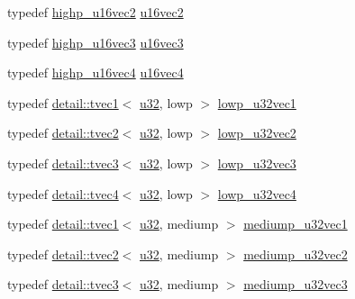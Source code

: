 \begin{DoxyCompactItemize}
\item 
typedef \hyperlink{group__gtc__type__precision_gafad4245d389a4990eb505cd74a2d0a6f}{highp\+\_\+u16vec2} \hyperlink{group__gtc__type__precision_ga4beac509930099bb494b4bd0a44c49f2}{u16vec2}
\item 
typedef \hyperlink{group__gtc__type__precision_gad98b30ad9bbfb79233340be3ba53ceb6}{highp\+\_\+u16vec3} \hyperlink{group__gtc__type__precision_ga372e1184da616b77fcbd48b8c166c24a}{u16vec3}
\item 
typedef \hyperlink{group__gtc__type__precision_ga89074b108ec0643cffdfd008bedd3ffb}{highp\+\_\+u16vec4} \hyperlink{group__gtc__type__precision_gaac02cce8820bcdbbeea9659aeaa718fb}{u16vec4}
\item 
typedef \hyperlink{structglm_1_1detail_1_1tvec1}{detail\+::tvec1}$<$ \hyperlink{group__gtc__type__precision_ga54e837745059fd29017bed71cfa0a8db}{u32}, lowp $>$ \hyperlink{group__gtc__type__precision_ga579d71c2ae1225b689aaab0bc7d33146}{lowp\+\_\+u32vec1}
\item 
typedef \hyperlink{structglm_1_1detail_1_1tvec2}{detail\+::tvec2}$<$ \hyperlink{group__gtc__type__precision_ga54e837745059fd29017bed71cfa0a8db}{u32}, lowp $>$ \hyperlink{group__gtc__type__precision_ga2f588e15c609987b89bd03f50b2a492d}{lowp\+\_\+u32vec2}
\item 
typedef \hyperlink{structglm_1_1detail_1_1tvec3}{detail\+::tvec3}$<$ \hyperlink{group__gtc__type__precision_ga54e837745059fd29017bed71cfa0a8db}{u32}, lowp $>$ \hyperlink{group__gtc__type__precision_ga53b6133cd2491fce1445c1744556b1bb}{lowp\+\_\+u32vec3}
\item 
typedef \hyperlink{structglm_1_1detail_1_1tvec4}{detail\+::tvec4}$<$ \hyperlink{group__gtc__type__precision_ga54e837745059fd29017bed71cfa0a8db}{u32}, lowp $>$ \hyperlink{group__gtc__type__precision_gaad6408408c9c5321cb6ee54f201de578}{lowp\+\_\+u32vec4}
\item 
typedef \hyperlink{structglm_1_1detail_1_1tvec1}{detail\+::tvec1}$<$ \hyperlink{group__gtc__type__precision_ga54e837745059fd29017bed71cfa0a8db}{u32}, mediump $>$ \hyperlink{group__gtc__type__precision_ga323fb0ed8f492d918b087226db2994f3}{mediump\+\_\+u32vec1}
\item 
typedef \hyperlink{structglm_1_1detail_1_1tvec2}{detail\+::tvec2}$<$ \hyperlink{group__gtc__type__precision_ga54e837745059fd29017bed71cfa0a8db}{u32}, mediump $>$ \hyperlink{group__gtc__type__precision_ga5d16ea7e110d8ba923ca347c16704f88}{mediump\+\_\+u32vec2}
\item 
typedef \hyperlink{structglm_1_1detail_1_1tvec3}{detail\+::tvec3}$<$ \hyperlink{group__gtc__type__precision_ga54e837745059fd29017bed71cfa0a8db}{u32}, mediump $>$ \hyperlink{group__gtc__type__precision_ga84a903ce8834b22f78d80a64eb0181bb}{mediump\+\_\+u32vec3}

\end{DoxyCompactItemize}
